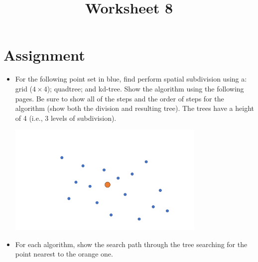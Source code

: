 \documentclass[a4paper,12pt]{article}
\title{Worksheet 8}
\begin{document}
\maketitle

\worksheetGroundRules


\vspace{5pt}
\section{Assignment}

\begin{itemize}



\item For the following point set in blue, find perform spatial subdivision using a: grid ($4\times4$); quadtree; and kd-tree. Show the algorithm using the following pages. Be sure to show all of the steps and the order of steps for the algorithm (show both the division and resulting tree). The trees have a height of 4 (i.e., 3 levels of subdivision).

\begin{center}
\includegraphics[width=9.5cm]{../images/spatial_subd_find.pdf}
\end{center}


\item For each algorithm, show the search path through the tree searching for the point nearest to the orange one.


\end{itemize}


\worksheetSubmission




\newpage
\end{document}
